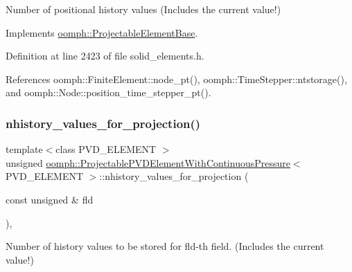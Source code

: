 Number of positional history values (Includes the current value!) 



Implements \hyperlink{classoomph_1_1ProjectableElementBase_ab4ecd0cd24000a3ed675dc7198203c1f}{oomph\+::\+Projectable\+Element\+Base}.



Definition at line 2423 of file solid\+\_\+elements.\+h.



References oomph\+::\+Finite\+Element\+::node\+\_\+pt(), oomph\+::\+Time\+Stepper\+::ntstorage(), and oomph\+::\+Node\+::position\+\_\+time\+\_\+stepper\+\_\+pt().

\mbox{\label{classoomph_1_1ProjectablePVDElementWithContinuousPressure_ae2e030a1740d31e491e9083c6b0107b4}} 
\subsubsection{\texorpdfstring{nhistory\+\_\+values\+\_\+for\+\_\+projection()}{nhistory\_values\_for\_projection()}}
{\footnotesize\ttfamily template$<$class P\+V\+D\+\_\+\+E\+L\+E\+M\+E\+NT $>$ \\
unsigned \hyperlink{classoomph_1_1ProjectablePVDElementWithContinuousPressure}{oomph\+::\+Projectable\+P\+V\+D\+Element\+With\+Continuous\+Pressure}$<$ P\+V\+D\+\_\+\+E\+L\+E\+M\+E\+NT $>$\+::nhistory\+\_\+values\+\_\+for\+\_\+projection (\begin{DoxyParamCaption}\item[{const unsigned \&}]{fld }\end{DoxyParamCaption})\hspace{0.3cm}{\ttfamily [inline]}, {\ttfamily [virtual]}}



Number of history values to be stored for fld-\/th field. (Includes the current value!) 



